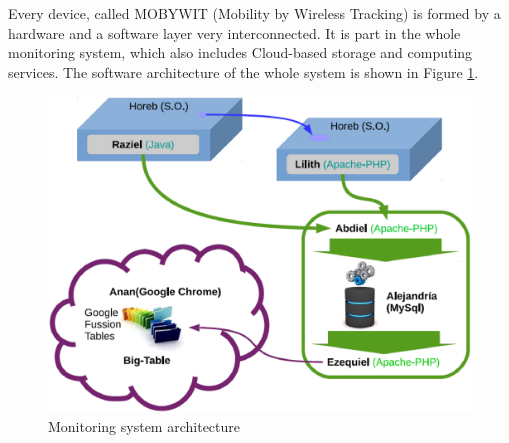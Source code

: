\documentclass[preprint]{elsarticle}
\begin{document}
Every device, called MOBYWIT (Mobility by Wireless Tracking) is formed by a hardware and a software layer very interconnected. It is part in the whole monitoring system, which also includes Cloud-based storage and computing services. The software architecture of the whole system is shown in Figure \ref{fig:mobywit}.

\begin{figure}[ht]
	\begin{center}
		\includegraphics[scale=0.4]{imgs/mobywit.eps}
		\caption{Monitoring system architecture}
	\label{fig:mobywit}
	\end{center}
\end{figure}
\end{document}
